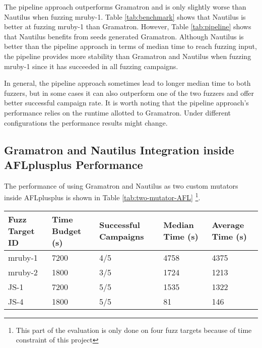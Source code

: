 The pipeline approach outperforms Gramatron and is only slightly worse than Nautilus when fuzzing mruby-1. Table \ref{tab:benchmark} shows that Nautilus is better at fuzzing mruby-1 than Gramatron. However, Table \ref{tab:pipeline} shows that Nautilus benefits from seeds generated Gramatron. Although Nautilus is better than the pipeline approach in terms of median time to reach fuzzing input, the pipeline provides more stability than Gramatron and Nautilus when fuzzing mruby-1 since it has succeeded in all fuzzing campaigns.

In general, the pipeline approach sometimes lead to longer median time to both fuzzers, but in some cases it can also outperform one of the two fuzzers and offer better successful campaign rate. It is worth noting that the pipeline approach's performance relies on the runtime allotted to Gramatron. Under different configurations the performance results might change. 
\subsection{Gramatron and Nautilus Integration inside AFLplusplus Performance}
The performance of using Gramatron and Nautilus as two custom mutators inside AFLplusplus is shown in Table \ref{tab:two-mutator-AFL} \footnote{This part of the evaluation is only done on four fuzz targets because of time constraint of this project}. 
\begin{table*}[]
\caption{Performance of combining two custom mutators inside AFLplusplus}
\begin{tabular}{lllll}
\hline
Fuzz Target ID & Time Budget (s) & Successful Campaigns & Median Time (s) & Average Time (s) \\ \hline
mruby-1        & 7200            & 4/5                  & 4758            & 4375             \\
mruby-2        & 1800            & 3/5                  & 1724            & 1213             \\
JS-1           & 7200            & 5/5                  & 1535            & 1322             \\
JS-4           & 1800            & 5/5                  & 81              & 146              \\ \hline
\end{tabular}\label{tab:two-mutator-AFL}
\end{table*}

